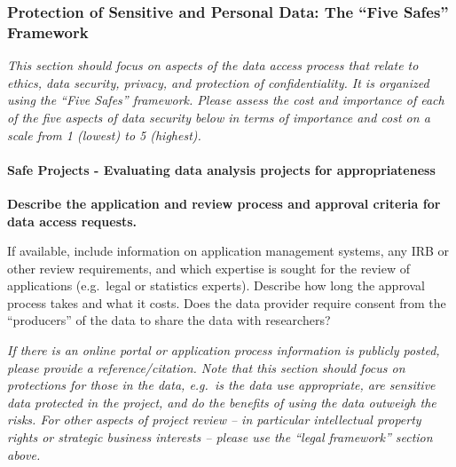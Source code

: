 \documentclass[
]{WileySix}
\begin{document}
\hypertarget{protection-of-sensitive-and-personal-data-the-five-safes-framework-9}{%
\subsubsection*{Protection of Sensitive and Personal Data: The ``Five Safes'' Framework}\label{protection-of-sensitive-and-personal-data-the-five-safes-framework-9}}

\emph{This section should focus on aspects of the data access process that relate to ethics, data security, privacy, and protection of confidentiality. It is organized using the ``Five Safes'' framework. Please assess the cost and importance of each of the five aspects of data security below in terms of importance and cost on a scale from 1 (lowest) to 5 (highest).}

\hypertarget{safe-projects---evaluating-data-analysis-projects-for-appropriateness}{%
\paragraph{Safe Projects - Evaluating data analysis projects for appropriateness}\label{safe-projects---evaluating-data-analysis-projects-for-appropriateness}}

\textbf{Describe the application and review process and approval criteria for data access requests.}

If available, include information on application management systems, any IRB or other review requirements, and which expertise is sought for the review of applications (e.g.~legal or statistics experts). Describe how long the approval process takes and what it costs. Does the data provider require consent from the ``producers'' of the data to share the data with researchers?

\emph{If there is an online portal or application process information is publicly posted, please provide a reference/citation. Note that this section should focus on protections for those in the data, e.g.~is the data use appropriate, are sensitive data protected in the project, and do the benefits of using the data outweigh the risks. For other aspects of project review -- in particular intellectual property rights or strategic business interests -- please use the ``legal framework'' section above.}
\end{document}
